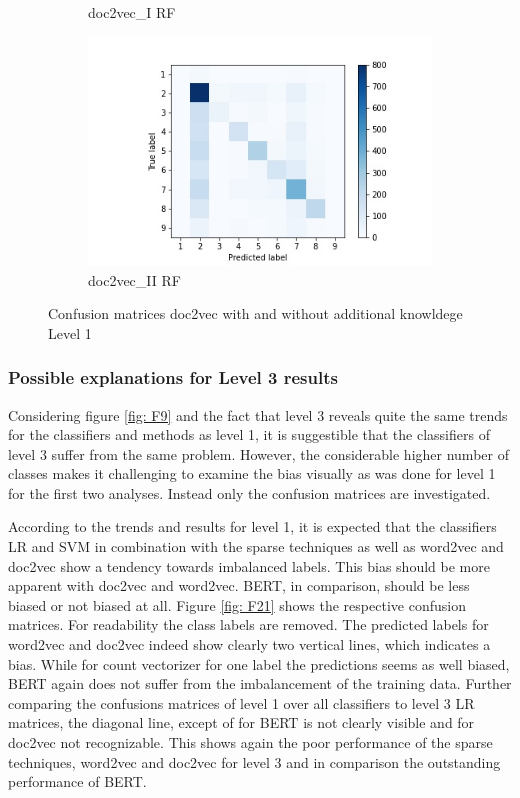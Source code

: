 \documentclass[12pt, a4paper, titlepage]{article}
\begin{document}
\begin{figure}
\begin{subfigure}[b]{0.475\textwidth}
    {{\small doc2vec\_I \ac{RF}}}    
  \end{subfigure}
  \hfill
  \begin{subfigure}[b]{0.475\textwidth}   
      \centering 
      \includegraphics[width=\textwidth]{cm_doc2vec_with_RF.jpg}
      {{\small doc2vec\_II \ac{RF}}}    
  \end{subfigure}
  \caption{\label{fig: F24} Confusion matrices doc2vec with and without additional knowldege Level 1}
\end{figure}


\subsubsection*{Possible explanations for Level 3 results}
Considering figure \ref{fig: F9} and the fact that level 3 reveals quite the same trends for the classifiers and methods as level 1, it is suggestible that the classifiers of level 3 suffer from the same problem. However, the considerable higher number of classes makes it challenging to examine the bias visually as was done for level 1 for the first two analyses. Instead only the confusion matrices are investigated.

According to the trends and results for level 1, it is expected that the classifiers \ac{LR} and \ac{SVM} in combination with the sparse techniques as well as word2vec and doc2vec show a tendency towards imbalanced labels. This bias should be more apparent with doc2vec and word2vec. \ac{BERT}, in comparison, should be less biased or not biased at all. Figure \ref{fig: F21} shows the respective confusion matrices. For readability the class labels are removed. The predicted labels for word2vec and doc2vec indeed show clearly two vertical lines, which indicates a bias. While for count vectorizer for one label the predictions seems as well biased, \ac{BERT} again does not suffer from the imbalancement of the training data.  Further comparing the confusions matrices of level 1 over all classifiers to level 3 \ac{LR} matrices, the diagonal line, except of for \ac{BERT} is not clearly visible and for doc2vec not recognizable. This shows again the poor performance of the sparse techniques, word2vec and doc2vec for level 3 and in comparison the outstanding performance of \ac{BERT}. 
\end{document}
